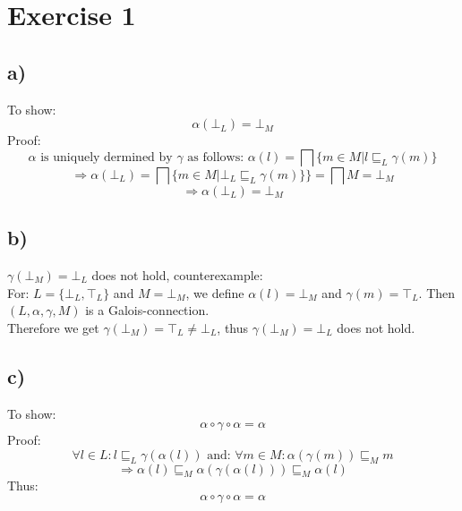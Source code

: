 \documentclass[fleqn,12pt]{article}
\begin{document}
\section*{Exercise 1}
\subsection*{a)}
To show:
$$\alpha(\bot_L) = \bot_M$$
Proof:
$$\alpha \text{ is uniquely dermined by $\gamma$ as follows: } \alpha(l) = \bigsqcap \{m \in M | l \sqsubseteq_L \gamma(m)\}$$
$$\Rightarrow  \alpha(\bot_L) = \bigsqcap \{m \in M | \bot_L \sqsubseteq_L \gamma(m) \}\} = \bigsqcap M = \bot_M$$
$$\Rightarrow \alpha(\bot_L) = \bot_M$$

\subsection*{b)}
$\gamma(\bot_M) = \bot_L$ does not hold, counterexample:\\
For: $L=\{\bot_L,\top_L\}$ and $M={\bot_M}$, we define $\alpha(l)= \bot_M$ and $\gamma(m)=\top_L$.
Then $(L,\alpha,\gamma,M)$ is a Galois-connection.\\
Therefore we get $\gamma(\bot_M) = \top_L \neq \bot_L$, thus $\gamma(\bot_M) = \bot_L$ does not hold.

\subsection*{c)}
To show:
$$\alpha \circ \gamma \circ \alpha = \alpha$$
Proof:
$$\forall l \in L: l \sqsubseteq_{L} \gamma(\alpha(l)) \text{ and: } \forall m \in M: \alpha(\gamma(m)) \sqsubseteq_{M} m$$
$$\Rightarrow \alpha(l) \sqsubseteq_M \alpha(\gamma(\alpha(l))) \sqsubseteq_M \alpha(l)$$
Thus:
$$\alpha \circ \gamma \circ \alpha = \alpha$$
\end{document}
